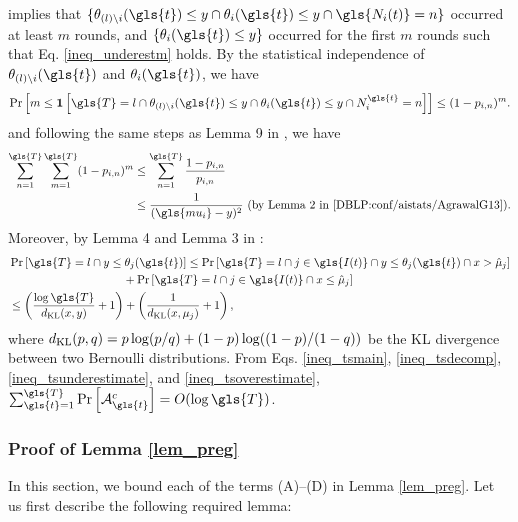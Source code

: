 implies that $\{\theta_{(l)\setminus i}(\gls{t}) \le y \cap \theta_i(\gls{t}) \le y \cap \gls{N_i(t)}=n\}$ occurred at least $m$ rounds, and $\{\theta_i(\gls{t}) \le y\}$ occurred for the first $m$ rounds such that Eq. \eqref{ineq_underestm} holds. 
By the statistical independence of $\theta_{(l)\setminus i}(\gls{t})$ and $ \theta_i(\gls{t})$, we have
\[
\Pr\left[m \le \Ind\left[{\gls{T}} = l \cap \theta_{(l)\setminus i}(\gls{t}) \le y \cap \theta_i(\gls{t}) \le y \cap N_i^{\gls{t}} =n\right] \right] \le (1 - p_{i,n})^m.
\]
and following the same steps as Lemma 9 in \cite{DBLP:conf/icml/KomiyamaHN15}, we have
\begin{align}
\sum_{n=1}^{\gls{T}} \sum_{m=1}^{\gls{T}} (1-p_{i,n})^m
&\le \sum_{n=1}^{\gls{T}} \frac{1-p_{i,n}}{p_{i,n}} \nn
&\le \frac{1}{(\gls{mu_i} - y)^2} \text{\ (by Lemma 2 in \cite{DBLP:conf/aistats/AgrawalG13})}. 
\label{ineq_tsunderestimate}
\end{align}
Moreover, by Lemma 4 and Lemma 3 in \cite{DBLP:conf/aistats/AgrawalG13}:
\begin{align}
&\Pr\left[{\gls{T}} = l \cap y \le \theta_j(\gls{t})\right] \le \Pr\left[{\gls{T}} = l \cap j \in \gls{I(t)} \cap y \le \theta_j(\gls{t}) \cap x > \hat{\mu}_j\right]
\nn
&\quad\quad\quad\quad\quad\quad\quad\quad\quad\quad + \Pr\left[{\gls{T}} = l \cap j \in \gls{I(t)} \cap x \le \hat{\mu}_j\right] \nn
&\le \left(\frac{\log \gls{T}}{\KL(x,y)} + 1\right) + \left(\frac{1}{\KL(x, \mu_j)} + 1\right),
\label{ineq_tsoverestimate}
\end{align}
where $d_{\mathrm{KL}}(p,q)=p\log(p/q)+(1-p)\log((1-p)/(1-q))$ be the KL divergence between two Bernoulli distributions. From Eqs. \eqref{ineq_tsmain}, \eqref{ineq_tsdecomp}, \eqref{ineq_tsunderestimate}, and \eqref{ineq_tsoverestimate},
$\sum_{\gls{t}=1}^{\gls{T}} \Pr\left[\mA^c_{\gls{t}}\right] = O(\log \gls{T})$.

\subsubsection{Proof of Lemma \ref{lem_preg}}
In this section, we bound each of the terms (A)--(D) in Lemma \ref{lem_preg}. Let us first describe the following required lemma:

